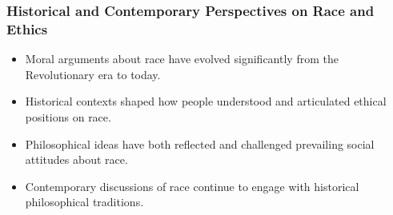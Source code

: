 \documentclass{beamer}
\begin{document}
	\begin{frame}
		\frametitle{Historical and Contemporary Perspectives on Race and Ethics}
		
		\begin{itemize}
			\item Moral arguments about race have evolved significantly from the Revolutionary era to today.
			\item Historical contexts shaped how people understood and articulated ethical positions on race.
			\item Philosophical ideas have both reflected and challenged prevailing social attitudes about race.
			\item Contemporary discussions of race continue to engage with historical philosophical traditions.
		\end{itemize}
		
		\begin{center}
		\end{center}
		
	\end{frame}
	
\end{document}
